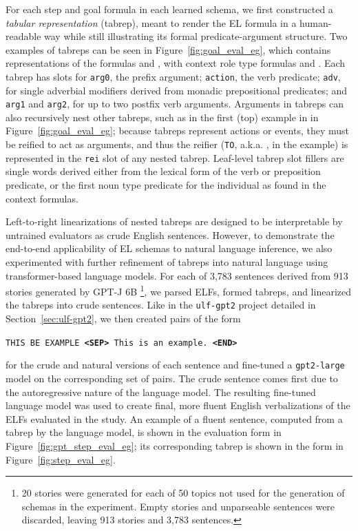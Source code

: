 For each step and goal formula in each learned schema, we first constructed a \textit{tabular representation} (tabrep), meant to render the EL formula in a human-readable way while still illustrating its formal predicate-argument structure. Two examples of tabreps can be seen in Figure~\ref{fig:goal_eval_eg}, which contains representations of the formulas  and , with context role type formulas  and . Each tabrep has slots for \texttt{arg0}, the prefix argument; \texttt{action}, the verb predicate; \texttt{adv}, for single adverbial modifiers derived from monadic prepositional predicates; and \texttt{arg1} and \texttt{arg2}, for up to two postfix verb arguments. Arguments in tabreps can also recursively nest other tabreps, such as in the first (top) example in in Figure~\ref{fig:goal_eval_eg}; because tabreps represent actions or events, they must be reified to act as arguments, and thus the reifier (\texttt{TO}, a.k.a. , in the example) is represented in the \texttt{rei} slot of any nested tabrep. Leaf-level tabrep slot fillers are single words derived either from the lexical form of the verb or preposition predicate, or the first noun type predicate for the individual as found in the context formulas.

Left-to-right linearizations of nested tabreps are designed to be interpretable by untrained evaluators as crude English sentences. However, to demonstrate the end-to-end applicability of EL schemas to natural language inference, we also experimented with further refinement of tabreps into natural language using transformer-based language models. For each of 3,783 sentences derived from 913 stories generated by GPT-J 6B \footnote{20 stories were generated for each of 50 topics not used for the generation of schemas in the experiment. Empty stories and unparseable sentences were discarded, leaving 913 stories and 3,783 sentences.}, we parsed ELFs, formed tabreps, and linearized the tabreps into crude sentences. Like in the \texttt{ulf-gpt2} project detailed in Section~\ref{sec:ulf-gpt2}, we then created pairs of the form \begin{center}
\texttt{THIS BE EXAMPLE \textbf{<SEP>} This is an example. \textbf{<END>}}
\end{center}
for the crude and natural versions of each sentence and fine-tuned a \texttt{gpt2-large} model on the corresponding set of pairs. The crude sentence comes first due to the autoregressive nature of the language model. The resulting fine-tuned language model was used to create final, more fluent English verbalizations of the ELFs evaluated in the study. An example of a fluent sentence, computed from a tabrep by the language model, is shown in the evaluation form in Figure~\ref{fig:gpt_step_eval_eg}; its corresponding tabrep is shown in the form in Figure~\ref{fig:step_eval_eg}.


